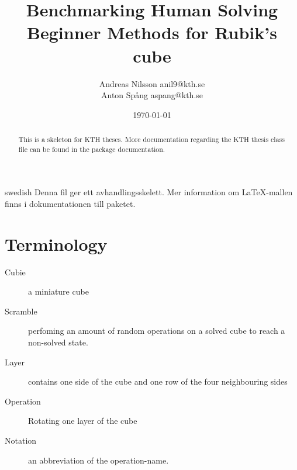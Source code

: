 \documentclass[a4paper,11pt]{kth-mag}
\title{Benchmarking Human Solving Beginner Methods for
           Rubik's cube}
\author{Andreas Nilsson  anil9@kth.se\\Anton Spång  aspang@kth.se}
\date{\today}
\begin{document}
\frontmatter
\pagestyle{empty}
\removepagenumbers
\maketitle
{}
\begin{abstract}
  This is a skeleton for KTH theses. More documentation
  regarding the KTH thesis class file can be found in
  the package documentation.


\end{abstract}
\clearpage
\begin{foreignabstract}{swedish}
  Denna fil ger ett avhandlingsskelett.
  Mer information om \LaTeX-mallen finns i
  dokumentationen till paketet.
\end{foreignabstract}

\clearpage
\tableofcontents*
\mainmatter
\section{Terminology} 
	\begin{description}
		\item[Cubie] a miniature cube
		\item[Scramble] perfoming an amount of random operations on a solved cube to reach a non-solved state.
		\item[Layer] contains one side of the cube and one row of the four neighbouring sides 
		\item[Operation] Rotating one layer of the cube
		\item[Notation] an abbreviation of the operation-name.
	\end{description}

\pagestyle{newchap}
\end{document}
